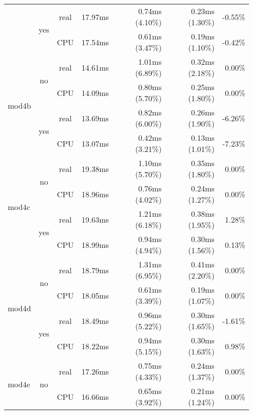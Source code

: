 \documentclass[en]{pracamgr}
\begin{document}
\begin{small}
\begin{longtable}{|l|c|c|r|r|r|r|}
                          \cline{2-7}
                          & \multirow{2}{*}{yes} & real & 17.97ms & 0.74ms (4.10\%) & 0.23ms (1.30\%) & -0.55\% \\*
                          &                      & CPU  & 17.54ms & 0.61ms (3.47\%) & 0.19ms (1.10\%) & -0.42\% \\
\hline
\multirow{4}{*}{mod4b}    & \multirow{2}{*}{no}  & real & 14.61ms & 1.01ms (6.89\%) & 0.32ms (2.18\%) & 0.00\% \\*
                          &                      & CPU  & 14.09ms & 0.80ms (5.70\%) & 0.25ms (1.80\%) & 0.00\% \\*
                          \cline{2-7}
                          & \multirow{2}{*}{yes} & real & 13.69ms & 0.82ms (6.00\%) & 0.26ms (1.90\%) & -6.26\% \\*
                          &                      & CPU  & 13.07ms & 0.42ms (3.21\%) & 0.13ms (1.01\%) & -7.23\% \\
\hline
\multirow{4}{*}{mod4c}    & \multirow{2}{*}{no}  & real & 19.38ms & 1.10ms (5.70\%) & 0.35ms (1.80\%) & 0.00\% \\*
                          &                      & CPU  & 18.96ms & 0.76ms (4.02\%) & 0.24ms (1.27\%) & 0.00\% \\*
                          \cline{2-7}
                          & \multirow{2}{*}{yes} & real & 19.63ms & 1.21ms (6.18\%) & 0.38ms (1.95\%) & 1.28\% \\*
                          &                      & CPU  & 18.99ms & 0.94ms (4.94\%) & 0.30ms (1.56\%) & 0.13\% \\
\hline
\multirow{4}{*}{mod4d}    & \multirow{2}{*}{no}  & real & 18.79ms & 1.31ms (6.95\%) & 0.41ms (2.20\%) & 0.00\% \\*
                          &                      & CPU  & 18.05ms & 0.61ms (3.39\%) & 0.19ms (1.07\%) & 0.00\% \\*
                          \cline{2-7}
                          & \multirow{2}{*}{yes} & real & 18.49ms & 0.96ms (5.22\%) & 0.30ms (1.65\%) & -1.61\% \\*
                          &                      & CPU  & 18.22ms & 0.94ms (5.15\%) & 0.30ms (1.63\%) & 0.98\% \\
\hline
\multirow{4}{*}{mod4e}    & \multirow{2}{*}{no}  & real & 17.26ms & 0.75ms (4.33\%) & 0.24ms (1.37\%) & 0.00\% \\*
                          &                      & CPU  & 16.66ms & 0.65ms (3.92\%) & 0.21ms (1.24\%) & 0.00\% \\*

\end{longtable}
\end{small}
\end{document}
